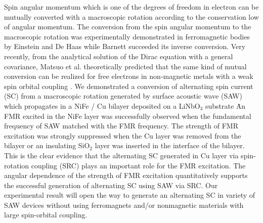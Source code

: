 Spin angular momentum which is one of the degrees of freedom in electron can be mutually converted with a macroscopic rotation according to the conservation low of angular momentum. The conversion from the spin angular momentum to the macroscopic rotation was experimentally demonstrated in ferromagnetic bodies by Einstein and De Haas while Barnett succeeded its inverse conversion. Very recently, from the analytical solution of the Dirac equation with a general covariance, Matsuo et al. theoretically predicted that the same kind of mutual conversion can be realized for free electrons in non-magnetic metals with a weak spin orbital coupling \cite{Matsuo_2013}. We demonstrated a conversion of alternating spin current (SC) from a macroscopic rotation generated by surface acoustic wave (SAW) which propagates in a NiFe / Cu bilayer deposited on a LiNbO$_3$ substrate \cite{Kobayashi_2017} \. An FMR excited in the NiFe layer was successfully observed when the fundamental frequency of SAW matched with the FMR frequency. The strength of FMR excitation was strongly suppressed when the Cu layer was removed from the bilayer or an insulating SiO$_2$ layer was inserted in the interface of the bilayer. This is the clear evidence that the alternating SC generated in Cu layer via spin-rotation coupling (SRC) plays an important role for the FMR excitation. The angular dependence of the strength of FMR excitation quantitatively supports the successful generation of alternating SC using SAW via SRC. Our experimental result will open the way to generate an alternating SC in variety of SAW devices without using ferromagnets and/or nonmagnetic materials with large spin-orbital coupling.